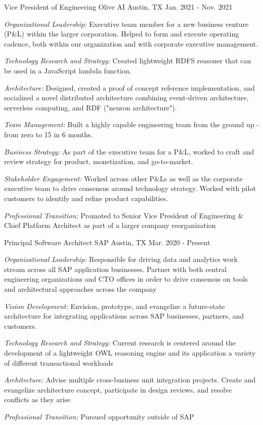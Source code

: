 \begin{cventries}
\cventry
{Vice President of Engineering}
{Olive AI}
{Austin, TX}
{Jan. 2021 - Nov. 2021}
{
  \begin{cvitems}
    \item{\emph{Organizational Leadership:} Executive team member for a new business venture (P\&L) within the larger corporation. Helped to form and execute operating cadence, both within our organization and with corporate executive management. }
    \item{\emph{Technology Research and Strategy:} Created lightweight RDFS reasoner that can be used in a JavaScript lambda function. }
    \item{\emph{Architecture:} Designed, created a proof of concept reference implementation, and socialized a novel distributed architecture combining event-driven architecture, serverless computing, and RDF ("neuron architecture"). }
    \item{\emph{Team Management:} Built a highly capable engineering team from the ground up - from zero to 15 in 6 months. }
    \item{\emph{Business Strategy:} As part of the executive team for a P\&L, worked to craft and review strategy for product, monetization, and go-to-market. }
    \item{\emph{Stakeholder Engagement:} Worked across other P\&Ls as well as the corporate executive team to drive consensus around technology strategy. Worked with pilot customers to identify and refine product capabilities. }
    \item{\emph{Professional Transition:} Promoted to Senior Vice President of Engineering \& Chief Platform Architect as part of a larger company reorganization }
  \end{cvitems}
}


\cventry
{Principal Software Architect}
{SAP}
{Austin, TX}
{Mar. 2020 - Present}
{
  \begin{cvitems}
  \item {\emph{Organizational Leadership:} Responsible for driving data and analytics work stream across all SAP application businesses. Partner with both central engineering organizations and CTO offices in order to drive consensus on tools and architectural approaches across the company }
  \item {\emph{Vision Development:} Envision, prototype, and evangelize a future-state architecture for integrating applications across SAP businesses, partners, and customers.}
  \item {\emph{Technology Research and Strategy:} Current research is centered around the development of a lightweight OWL reasoning engine and its application a variety of different transactional workloads }
  \item {\emph{Architecture:} Advise multiple cross-business unit integration projects. Create and evangelize architecture concept, participate in design reviews, and resolve conflicts as they arise }
  \item{\emph{Professional Transition:} Pursued opportunity outside of SAP}
  \end{cvitems}
}


\end{cventries}
